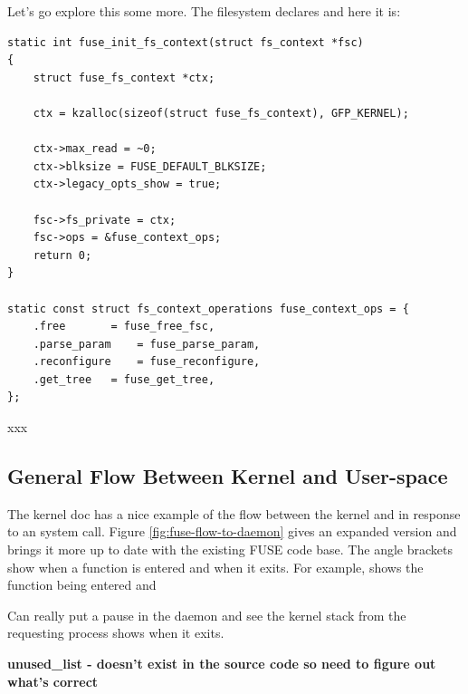 \noindent
Let's go explore this some more. The  filesystem declares  and here it is:

\begin{lstlisting}
static int fuse_init_fs_context(struct fs_context *fsc)
{
    struct fuse_fs_context *ctx;

    ctx = kzalloc(sizeof(struct fuse_fs_context), GFP_KERNEL);

    ctx->max_read = ~0;
    ctx->blksize = FUSE_DEFAULT_BLKSIZE;
    ctx->legacy_opts_show = true;

    fsc->fs_private = ctx;
    fsc->ops = &fuse_context_ops;
    return 0;
}

static const struct fs_context_operations fuse_context_ops = {
    .free       = fuse_free_fsc,
    .parse_param    = fuse_parse_param,
    .reconfigure    = fuse_reconfigure,
    .get_tree   = fuse_get_tree,
};
\end{lstlisting}

\noindent
xxx


\subsection{General Flow Between Kernel and User-space}\label{general-flow}

The kernel doc has a nice example of the flow between the kernel and  in response to an  system call. Figure \ref{fig:fuse-flow-to-daemon} gives an expanded version and brings it more up to date with the existing FUSE code base. The angle brackets show when a function is entered and when it exits. For example,  shows the function being entered and 

Can really put a pause in the daemon and see the kernel stack from the requesting process  shows when it exits.

\textbf{unused\_list - doesn't exist in the source code so need to figure out what's correct}

